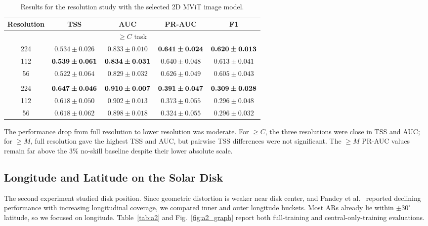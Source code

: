 \documentclass[runningheads]{llncs}
\begin{document}
\begin{table}[H]
\caption{Results for the resolution study with the selected 2D MViT image model.}
\label{tab:single}
\centering
\scriptsize
\setlength{\tabcolsep}{5pt}
\begin{tabular}{@{}ccccc@{}}
\toprule
Resolution & TSS & AUC & PR-AUC & F1 \\
\midrule
\multicolumn{5}{c}{$\geq C$ task} \\
\midrule
224 & $0.534 \pm 0.026$ & $0.833 \pm 0.010$ & $\bm{0.641 \pm 0.024}$ & $\bm{0.620 \pm 0.013}$ \\
112 & $\bm{0.539 \pm 0.061}$ & $\bm{0.834 \pm 0.031}$ & $0.640 \pm 0.048$ & $0.613 \pm 0.041$ \\
56 & $0.522 \pm 0.064$ & $0.829 \pm 0.032$ & $0.626 \pm 0.049$ & $0.605 \pm 0.043$ \\
\addlinespace
\multicolumn{5}{c}{$\geq M$ task} \\
\midrule
224 & $\bm{0.647 \pm 0.046}$ & $\bm{0.910 \pm 0.007}$ & $\bm{0.391 \pm 0.047}$ & $\bm{0.309 \pm 0.028}$ \\
112 & $0.618 \pm 0.050$ & $0.902 \pm 0.013$ & $0.373 \pm 0.055$ & $0.296 \pm 0.048$ \\
56 & $0.618 \pm 0.062$ & $0.898 \pm 0.018$ & $0.324 \pm 0.055$ & $0.296 \pm 0.032$ \\
\bottomrule
\end{tabular}
\end{table}


The performance drop from full resolution to lower resolution was moderate. For $\geq C$, the three resolutions were close in TSS and AUC; for $\geq M$, full resolution gave the highest TSS and AUC, but pairwise TSS differences were not significant. The $\geq M$ PR-AUC values remain far above the 3\% no-skill baseline despite their lower absolute scale.


\subsection{Longitude and Latitude on the Solar Disk}

The second experiment studied disk position. Since geometric distortion is weaker near disk center, and Pandey et al.~\cite{ref_long} reported declining performance with increasing longitudinal coverage, we compared inner and outer longitude buckets. Most ARs already lie within $\pm30^\circ$ latitude, so we focused on longitude. Table~\ref{tab:a2} and Fig.~\ref{fig:a2_graph} report both full-training and central-only-training evaluations.
\end{document}
